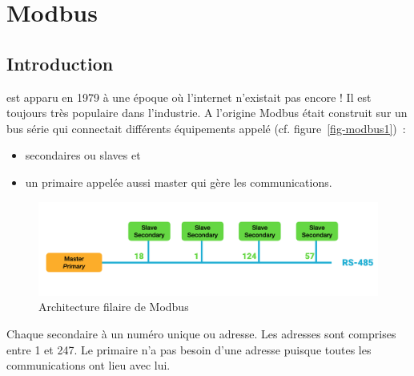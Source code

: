 





\chapter{Modbus}

\section{Introduction}
  \begin{figure}
\end{figure}
  est apparu en 1979 à une époque où l'internet n'existait pas encore ! Il est toujours très populaire dans l'industrie. A l'origine Modbus était construit sur un bus série  qui connectait différents équipements  appelé (cf. figure~\vref{fig-modbus1})~:
 \begin{itemize}
 \item secondaires ou slaves et 
 \item un primaire appelée aussi master qui gère les communications. 
 \end{itemize}
 
 
 
 \begin{figure}[tbp]
\centerline{\includegraphics[width=1\columnwidth]{Pictures/Capture35.png}}
\caption{Architecture filaire de Modbus}
\label{fig-modbus1}
\end{figure}

 
 
 Chaque secondaire à un numéro unique ou adresse. Les adresses sont comprises entre 1 et 247. Le primaire n'a pas besoin d'une adresse puisque toutes les communications ont lieu avec lui. 
 
   \vspace{1em}


